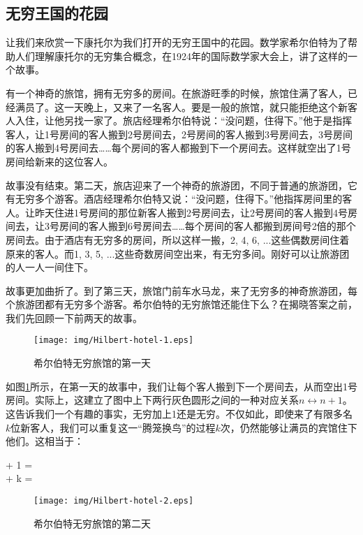\documentclass{article}
\begin{document}
\subsection{无穷王国的花园}

让我们来欣赏一下康托尔为我们打开的无穷王国中的花园。数学家希尔伯特为了帮助人们理解康托尔的无穷集合概念，在1924年的国际数学家大会上，讲了这样的一个故事。

有一个神奇的旅馆，拥有无穷多的房间。在旅游旺季的时候，旅馆住满了客人，已经满员了。这一天晚上，又来了一名客人。要是一般的旅馆，就只能拒绝这个新客人入住，让他另找一家了。旅店经理希尔伯特说：“没问题，住得下。”他于是指挥客人，让1号房间的客人搬到2号房间去，2号房间的客人搬到3号房间去，3号房间的客人搬到4号房间去……每个房间的客人都搬到下一个房间去。这样就空出了1号房间给新来的这位客人。

故事没有结束。第二天，旅店迎来了一个神奇的旅游团，不同于普通的旅游团，它有无穷多个游客。酒店经理希尔伯特又说：“没问题，住得下。”他指挥房间里的客人。让昨天住进1号房间的那位新客人搬到2号房间去，让2号房间的客人搬到4号房间去，让3号房间的客人搬到6号房间去……每个房间的客人都搬到房间号2倍的那个房间去。由于酒店有无穷多的房间，所以这样一搬，2, 4, 6, ...这些偶数房间住着原来的客人。而1, 3, 5, ...这些奇数房间空出来，有无穷多间。刚好可以让旅游团的人一人一间住下。

故事更加曲折了。到了第三天，旅馆门前车水马龙，来了无穷多的神奇旅游团，每个旅游团都有无穷多个游客。希尔伯特的无穷旅馆还能住下么？在揭晓答案之前，我们先回顾一下前两天的故事。

\begin{figure}[htbp]
 \centering
 \texttt{[image: img/Hilbert-hotel-1.eps]}
 \caption{希尔伯特无穷旅馆的第一天}
 \label{fig:Hilbert-hotel-1}
\end{figure}

如图\ref{fig:Hilbert-hotel-1}所示，在第一天的故事中，我们让每个客人搬到下一个房间去，从而空出1号房间。实际上，这建立了图中上下两行灰色圆形之间的一种对应关系$n \leftrightarrow n+1$。这告诉我们一个有趣的事实，无穷加上1还是无穷。不仅如此，即使来了有限多名$k$位新客人，我们可以重复这一“腾笼换鸟”的过程$k$次，仍然能够让满员的宾馆住下他们。这相当于：

\bean
\infty + 1 = \infty \\
\infty + k = \infty \\
\eean

\begin{figure}[htbp]
 \centering
 \texttt{[image: img/Hilbert-hotel-2.eps]}
 \caption{希尔伯特无穷旅馆的第二天}
 \label{fig:Hilbert-hotel-2}
\end{figure}
\end{document}
